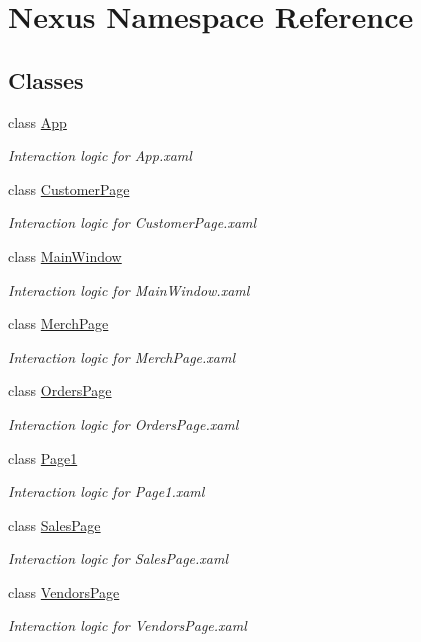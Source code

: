 \hypertarget{namespace_nexus}{}\section{Nexus Namespace Reference}
\label{namespace_nexus}
\subsection*{Classes}
\begin{DoxyCompactItemize}
\item 
class \mbox{\hyperlink{class_nexus_1_1_app}{App}}
\begin{DoxyCompactList}\small\item\em Interaction logic for App.\+xaml \end{DoxyCompactList}\item 
class \mbox{\hyperlink{class_nexus_1_1_customer_page}{Customer\+Page}}
\begin{DoxyCompactList}\small\item\em Interaction logic for Customer\+Page.\+xaml \end{DoxyCompactList}\item 
class \mbox{\hyperlink{class_nexus_1_1_main_window}{Main\+Window}}
\begin{DoxyCompactList}\small\item\em Interaction logic for Main\+Window.\+xaml \end{DoxyCompactList}\item 
class \mbox{\hyperlink{class_nexus_1_1_merch_page}{Merch\+Page}}
\begin{DoxyCompactList}\small\item\em Interaction logic for Merch\+Page.\+xaml \end{DoxyCompactList}\item 
class \mbox{\hyperlink{class_nexus_1_1_orders_page}{Orders\+Page}}
\begin{DoxyCompactList}\small\item\em Interaction logic for Orders\+Page.\+xaml \end{DoxyCompactList}\item 
class \mbox{\hyperlink{class_nexus_1_1_page1}{Page1}}
\begin{DoxyCompactList}\small\item\em Interaction logic for Page1.\+xaml \end{DoxyCompactList}\item 
class \mbox{\hyperlink{class_nexus_1_1_sales_page}{Sales\+Page}}
\begin{DoxyCompactList}\small\item\em Interaction logic for Sales\+Page.\+xaml \end{DoxyCompactList}\item 
class \mbox{\hyperlink{class_nexus_1_1_vendors_page}{Vendors\+Page}}
\begin{DoxyCompactList}\small\item\em Interaction logic for Vendors\+Page.\+xaml \end{DoxyCompactList}\end{DoxyCompactItemize}
